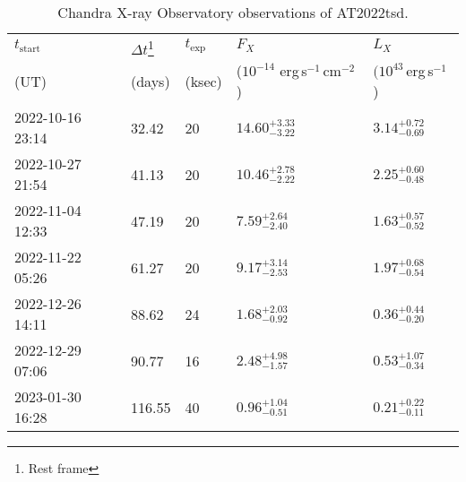 \documentclass{nature_plusfigure}
\begin{document}
\begin{supplement}
\begin{table*} 
\centering 
\begin{tabular}{lllll}
\hline\hline
$t_\mathrm{start}$ & $\Delta t$\footnote{Rest frame} & $t_\mathrm{exp}$ & $F_X$ & $L_X$\\ 
(UT) & (days) & (ksec) & ($10^{-14}$ erg\,s$^{-1}$\,cm$^{-2}$) & $(10^{43}$\,erg\,s$^{-1}$)\\ 
\hline
2022-10-16 23:14 & 32.42 & 20 & $14.60^{+3.33}_{-3.22}$ & $3.14^{+0.72}_{-0.69}$ \\ 
2022-10-27 21:54 & 41.13 & 20 & $10.46^{+2.78}_{-2.22}$ & $2.25^{+0.60}_{-0.48}$ \\ 
2022-11-04 12:33 & 47.19 & 20 & $7.59^{+2.64}_{-2.40}$ & $1.63^{+0.57}_{-0.52}$ \\ 
2022-11-22 05:26 & 61.27 & 20 & $9.17^{+3.14}_{-2.53}$ & $1.97^{+0.68}_{-0.54}$ \\ 
2022-12-26 14:11 & 88.62 & 24 & $1.68^{+2.03}_{-0.92}$ & $0.36^{+0.44}_{-0.20}$ \\ 
2022-12-29 07:06 & 90.77 & 16 & $2.48^{+4.98}_{-1.57}$ & $0.53^{+1.07}_{-0.34}$ \\ 
2023-01-30 16:28 & 116.55 & 40 & $0.96^{+1.04}_{-0.51}$ & $0.21^{+0.22}_{-0.11}$ \\ 
\hline 
\end{tabular} 
\caption{Chandra X-ray Observatory observations of AT2022tsd.} 
\label{tab:chandra} 
\end{table*} 


\clearpage


\end{supplement}
\end{document}
